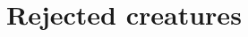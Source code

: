 \section{Rejected creatures}



\begin{comment}
\section{Species and Races}

\subsection{Generally on species}
Needless to say, species is a very important aspect of a character. Mith is inhabited by multiple intelligent species, many of which should perfectly well as player characters. 
\end{comment}

